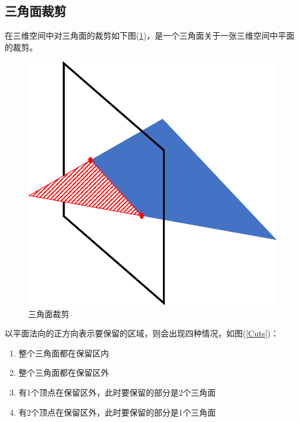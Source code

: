 \documentclass[12pt,oneside,a4paper]{ctexart}
\begin{document}
\subsection{三角面裁剪}
在三维空间中对三角面的裁剪如下图(\ref{Cut})，是一个三角面关于一张三维空间中平面的裁剪。
\begin{figure}[H]
	\centering
	\includegraphics[scale=0.5]{Picture/Cutting.png}
	\vspace{-2ex}
	\caption{三角面裁剪}
	\label{Cut}
\end{figure}

以平面法向的正方向表示要保留的区域，则会出现四种情况，如图(\ref{Cuts})：
\begin{enumerate}
	\item 整个三角面都在保留区内
	\item 整个三角面都在保留区外
	\item 有1个顶点在保留区外，此时要保留的部分是2个三角面
	\item 有2个顶点在保留区外，此时要保留的部分是1个三角面
\end{enumerate}
\end{document}
